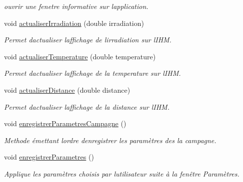\begin{DoxyCompactItemize}
\begin{DoxyCompactList}\small\item\em ouvrir une fenetre informative sur l\textquotesingle{}application. \end{DoxyCompactList}\item 
void \hyperlink{class_i_h_m_rov_a9a5108ce8f73fad9a38d02881ec5ae62}{actualiser\+Irradiation} (double irradiation)
\begin{DoxyCompactList}\small\item\em Permet d\textquotesingle{}actualiser l\textquotesingle{}affichage de l\textquotesingle{}irradiation sur l\textquotesingle{}I\+HM. \end{DoxyCompactList}\item 
void \hyperlink{class_i_h_m_rov_ae5f2c89b06d7dc09e9974428b14799f1}{actualiser\+Temperature} (double temperature)
\begin{DoxyCompactList}\small\item\em Permet d\textquotesingle{}actualiser l\textquotesingle{}affichage de la temperature sur l\textquotesingle{}I\+HM. \end{DoxyCompactList}\item 
void \hyperlink{class_i_h_m_rov_a891d51cf532d9cc8fc56c63a0c61e663}{actualiser\+Distance} (double distance)
\begin{DoxyCompactList}\small\item\em Permet d\textquotesingle{}actualiser l\textquotesingle{}affichage de la distance sur l\textquotesingle{}I\+HM. \end{DoxyCompactList}\item 
void \hyperlink{class_i_h_m_rov_a229194814bfb1fc94ab3cc86d6411921}{enregistrer\+Parametres\+Campagne} ()
\begin{DoxyCompactList}\small\item\em Methode émettant l\textquotesingle{}ordre d\textquotesingle{}enregistrer les paramètres des la campagne. \end{DoxyCompactList}\item 
void \hyperlink{class_i_h_m_rov_a94d31f4e748f3e4549eab42c8bc7e367}{enregistrer\+Parametres} ()
\begin{DoxyCompactList}\small\item\em Applique les paramètres choisis par l\textquotesingle{}utilisateur suite à la fenêtre Paramètres. \end{DoxyCompactList}\end{DoxyCompactItemize}
